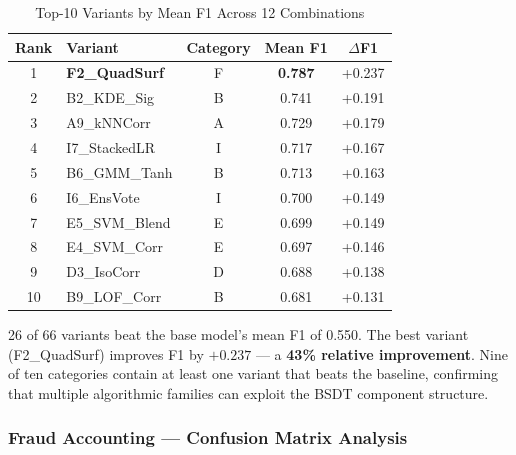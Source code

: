 \documentclass[journal]{IEEEtran}
\begin{document}
\begin{table}[!t]
\centering
\caption{Top-10 Variants by Mean F1 Across 12 Combinations}
\label{tab:leaderboard}
\begin{tabular}{@{}clccc@{}}
\toprule
\textbf{Rank} & \textbf{Variant} & \textbf{Category} & \textbf{Mean F1} & \textbf{$\Delta$F1} \\
\midrule
1  & \textbf{F2\_QuadSurf} & F & \textbf{0.787} & +0.237 \\
2  & B2\_KDE\_Sig    & B & 0.741 & +0.191 \\
3  & A9\_kNNCorr     & A & 0.729 & +0.179 \\
4  & I7\_StackedLR   & I & 0.717 & +0.167 \\
5  & B6\_GMM\_Tanh   & B & 0.713 & +0.163 \\
6  & I6\_EnsVote     & I & 0.700 & +0.149 \\
7  & E5\_SVM\_Blend  & E & 0.699 & +0.149 \\
8  & E4\_SVM\_Corr   & E & 0.697 & +0.146 \\
9  & D3\_IsoCorr     & D & 0.688 & +0.138 \\
10 & B9\_LOF\_Corr   & B & 0.681 & +0.131 \\
\bottomrule
\end{tabular}
\end{table}

26 of 66 variants beat the base model's mean F1 of 0.550. The best variant (F2\_QuadSurf) improves F1 by $+0.237$ --- a \textbf{43\% relative improvement}. Nine of ten categories contain at least one variant that beats the baseline, confirming that multiple algorithmic families can exploit the BSDT component structure.

\subsubsection{Fraud Accounting --- Confusion Matrix Analysis}
\end{document}
